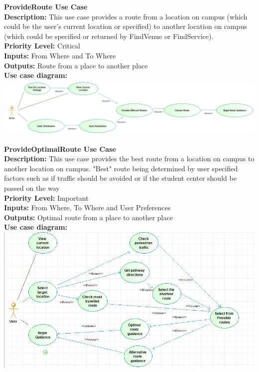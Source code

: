\documentclass[a4paper,12pt]{article}
\begin{document}
\textbf{\large ProvideRoute Use Case}\\
\textbf{Description: } This use case provides a route from a location on campus (which could be the user's current location or specified) to another location on campus (which could be specified or returned by FindVenue or FindService).\\
\textbf{Priority Level: } Critical\\
\textbf{Inputs:} From Where and To Where\\
\textbf{Outputs:} Route from a place to another place\\
\textbf{Use case diagram: }\\
\includegraphics[width=\textwidth]{images/provide_route.png}

\textbf{\large ProvideOptimalRoute Use Case}\\
\textbf{Description: } This use case provides the best route from a location on campus to another location on campus. "Best" route being determined by user specified factors such as if traffic should be avoided or if the student center should be passed on the way\\
\textbf{Priority Level: } Important\\
\textbf{Inputs:} From Where, To Where and User Preferences\\
\textbf{Outputs:} Optimal route from a place to another place\\
\textbf{Use case diagram: }\\
\includegraphics[width=\textwidth]{images/op_route.png}
\end{document}
